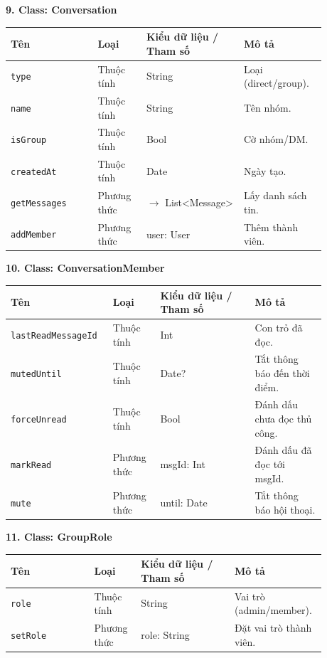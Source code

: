 \textbf{9. Class: Conversation}

{\small
\begin{longtable}{|p{0.25\linewidth}|p{0.14\linewidth}|p{0.28\linewidth}|p{0.21\linewidth}|}
\hline
\textbf{Tên} & \textbf{Loại} & \textbf{Kiểu dữ liệu / Tham số} & \textbf{Mô tả} \\ \hline
\endhead
\texttt{type} & Thuộc tính & String & Loại (direct/group). \\ \hline
\texttt{name} & Thuộc tính & String & Tên nhóm. \\ \hline
\texttt{isGroup} & Thuộc tính & Bool & Cờ nhóm/DM. \\ \hline
\texttt{createdAt} & Thuộc tính & Date & Ngày tạo. \\ \hline
\texttt{getMessages} & Phương thức & $\rightarrow$ List\textless Message\textgreater  & Lấy danh sách tin. \\ \hline
\texttt{addMember} & Phương thức & user: User & Thêm thành viên. \\ \hline
\end{longtable}
}

\textbf{10. Class: ConversationMember}

{\small
\begin{longtable}{|p{0.25\linewidth}|p{0.14\linewidth}|p{0.28\linewidth}|p{0.21\linewidth}|}
\hline
\textbf{Tên} & \textbf{Loại} & \textbf{Kiểu dữ liệu / Tham số} & \textbf{Mô tả} \\ \hline
\endhead
\texttt{lastReadMessageId} & Thuộc tính & Int & Con trỏ đã đọc. \\ \hline
\texttt{mutedUntil} & Thuộc tính & Date? & Tắt thông báo đến thời điểm. \\ \hline
\texttt{forceUnread} & Thuộc tính & Bool & Đánh dấu chưa đọc thủ công. \\ \hline
\texttt{markRead} & Phương thức & msgId: Int & Đánh dấu đã đọc tới msgId. \\ \hline
\texttt{mute} & Phương thức & until: Date & Tắt thông báo hội thoại. \\ \hline
\end{longtable}
}

\textbf{11. Class: GroupRole}

{\small
\begin{longtable}{|p{0.25\linewidth}|p{0.14\linewidth}|p{0.28\linewidth}|p{0.21\linewidth}|}
\hline
\textbf{Tên} & \textbf{Loại} & \textbf{Kiểu dữ liệu / Tham số} & \textbf{Mô tả} \\ \hline
\endhead
\texttt{role} & Thuộc tính & String & Vai trò (admin/member). \\ \hline
\texttt{setRole} & Phương thức & role: String & Đặt vai trò thành viên. \\ \hline
\end{longtable}
}


